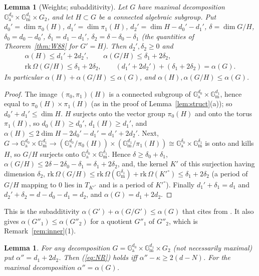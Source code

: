 \documentclass[11pt]{amsart}
\newtheorem{lemma}[theorem]{Lemma}
\theoremstyle{definition}
\newcommand{\Ga}{\mathbb{G}_{\mathrm a}}
\newcommand{\Gm}{\mathbb{G}_{\mathrm m}}
\begin{document}
\begin{lemma}[Weights; subadditivity]\label{lem:subadd}
Let $G$ have maximal decomposition $\Ga^{d_0}\times\Gm^{d_1}\times G_2$, and let $H\subset G$ be a connected algebraic
subgroup. Put $d_0'=\dim\pi_0(H)$, $d_1'=\dim\pi_1(H)$, $d_2'=\dim H-d_0'-d_1'$, $\delta=\dim G/H$, $\delta_0=d_0-d_0'$,
$\delta_1=d_1-d_1'$, $\delta_2=\delta-\delta_0-\delta_1$ (the quantities of Theorem~\ref{thm:W88} for $G'=H$). Then
$d_2',\delta_2\ge0$ and
\begin{gather*}
\alpha(H)\le d_1'+2d_2',\qquad \alpha(G/H)\le\delta_1+2\delta_2,\\
\mathrm{rk}\,\Omega(G/H)\le\delta_1+2\delta_2,\qquad (d_1'+2d_2')+(\delta_1+2\delta_2)=\alpha(G).
\end{gather*}
In particular $\alpha(H)+\alpha(G/H)\le\alpha(G)$, and $\alpha(H),\alpha(G/H)\le\alpha(G)$.
\end{lemma}

\begin{proof}
The image $(\pi_0,\pi_1)(H)$ is a connected subgroup of $\Ga^{d_0}\times\Gm^{d_1}$, hence equal to $\pi_0(H)\times\pi_1(H)$
(as in the proof of Lemma~\ref{lem:struct}(a)); so $d_0'+d_1'\le\dim H$. $H$ surjects onto the vector group $\pi_0(H)$ and
onto the torus $\pi_1(H)$, so $d_0(H)\ge d_0'$, $d_1(H)\ge d_1'$, and
$\alpha(H)\le2\dim H-2d_0'-d_1'=d_1'+2d_2'$. Next, $G\to\Ga^{d_0}\times\Gm^{d_1}\to(\Ga^{d_0}/\pi_0(H))\times(\Gm^{d_1}/\pi_1(H))
\cong\Ga^{\delta_0}\times\Gm^{\delta_1}$ is onto and kills $H$, so $G/H$ surjects onto $\Ga^{\delta_0}\times\Gm^{\delta_1}$.
Hence $\delta\ge\delta_0+\delta_1$, $\alpha(G/H)\le2\delta-2\delta_0-\delta_1=\delta_1+2\delta_2$, and, the kernel $K'$ of this
surjection having dimension $\delta_2$, $\mathrm{rk}\,\Omega(G/H)\le\mathrm{rk}\,\Omega(\Gm^{\delta_1})+
\mathrm{rk}\,\Omega(K'^\circ)\le\delta_1+2\delta_2$ (a period of $G/H$ mapping to $0$ lies in $T_{K'^\circ}$ and is a period
of $K'^\circ$). Finally $d_1'+\delta_1=d_1$ and $d_2'+\delta_2=d-d_0-d_1=d_2$, and $\alpha(G)=d_1+2d_2$.
\end{proof}

\noindent This is the subadditivity $\alpha(G')+\alpha(G/G')\le\alpha(G)$ that \cite[p.~359]{RW93} cites from
\cite[Lemme~4.3]{R1}. It also gives $\alpha(G''_1)\le\alpha(G''_2)$ for a quotient $G''_1$ of $G''_2$, which is
Remark~\ref{rem:inner}(1).

\begin{lemma}\label{lem:NRintr}
For any decomposition $G=\Ga^{d_0}\times\Gm^{d_1}\times G_2$ (not necessarily maximal) put $\alpha''=d_1+2d_2$. Then
(\ref{eq:NR}) holds iff $\alpha''-\kappa\ge2(d-N)$. For the maximal decomposition $\alpha''=\alpha(G)$.
\end{lemma}
\end{document}
